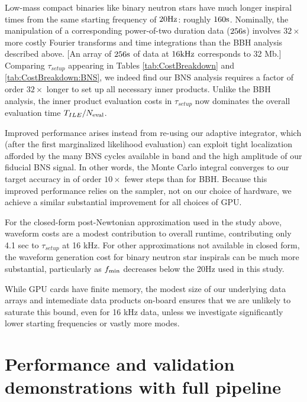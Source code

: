 \documentclass[twocolumn,prd,nofootinbib]{revtex4}
\newcommand\unit[1]{{\rm #1}}
\newcommand\editremark[1]{{\color{red} #1}}
\begin{document}
Low-mass compact binaries like binary neutron stars have much longer inspiral times from the same starting frequency of
$20\unit{Hz}$: roughly $160 \unit{s}$.   Nominally, the manipulation of a corresponding power-of-two duration data ($256\unit{s}$) involves
$32\times$ more costly Fourier transforms and time integrations than the BBH analysis described above.  
[An array of $256\unit{s}$ of data at $16\unit{kHz}$ corresponds to  32 Mb.]  Comparing $\tau_{setup}$ appearing in Tables
 \ref{tab:CostBreakdown} and  \ref{tab:CostBreakdown:BNS}, we indeed find our BNS analysis requires  a factor of order   $32\times$
 longer to set up all necessary inner products.  Unlike the BBH analysis, the inner product evaluation costs in
 $\tau_{setup}$ now dominates the
 overall evaluation time $T_{ILE}/N_{\rm eval}$. 


Improved performance arises instead from re-using our adaptive integrator, which (after the first marginalized
likelihood evaluation) can exploit tight localization afforded by the many BNS cycles available in band and the high
amplitude of our fiducial BNS signal.  In other
words, the Monte Carlo integral converges to our target accuracy in of order $10\times $ fewer steps than for BBH.  
Because this improved performance relies on the sampler, not on our choice of hardware, we achieve a similar substantial
improvement for all choices of GPU.




For the closed-form post-Newtonian approximation used in the study above, waveform costs are a modest contribution to
overall runtime, contributing only 4.1 sec to $\tau_{setup}$ at 16 kHz.
For other approximations not available in closed form, the waveform generation cost for binary neutron star inspirals
can be much more substantial, particularly as $f_{\rm min}$ decreases below the 20\unit{Hz} used in this study.  


While GPU cards have finite memory, the modest size of our underlying data arrays and intemediate data products on-board ensures that we are unlikely to
saturate this bound, even for 16 kHz data, unless we investigate significantly lower starting frequencies or
vastly more modes.

\section{Performance and validation demonstrations with full pipeline}
\label{sec:end-to-end}
\end{document}
